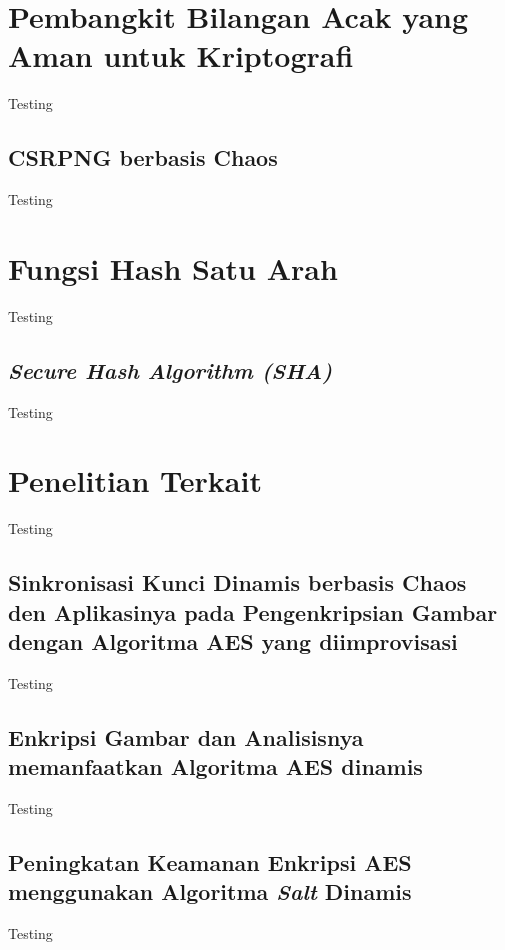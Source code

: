\section{Pembangkit Bilangan Acak yang Aman untuk Kriptografi}
Testing

\subsection{CSRPNG berbasis Chaos}
Testing

\section{Fungsi Hash Satu Arah}
Testing

\subsection{\emph{Secure Hash Algorithm (SHA)}}
Testing

\section{Penelitian Terkait}
Testing

\subsection{Sinkronisasi Kunci Dinamis berbasis Chaos den Aplikasinya pada Pengenkripsian Gambar dengan Algoritma AES yang diimprovisasi}
Testing

\subsection{Enkripsi Gambar dan Analisisnya memanfaatkan Algoritma AES dinamis}
Testing

\subsection{Peningkatan Keamanan Enkripsi AES menggunakan Algoritma \emph{Salt} Dinamis}
Testing
